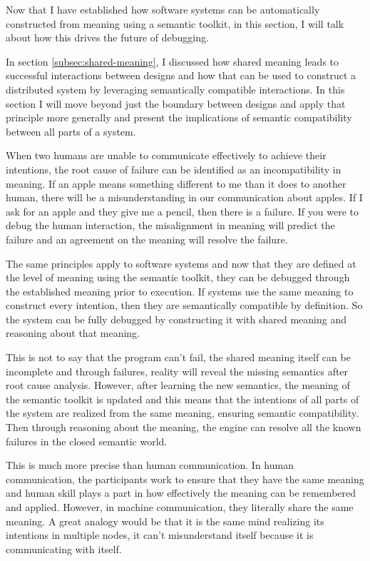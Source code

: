 Now that I have established how software systems can be automatically constructed from meaning using a semantic toolkit, in this section, I will talk about how this drives the future of debugging. 

In section \ref{subsec:shared-meaning}, I discussed how shared meaning leads to successful interactions between designs and how that can be used to construct a distributed system by leveraging semantically compatible interactions. In this section I will move beyond just the boundary between designs and apply that principle more generally and present the implications of semantic compatibility between all parts of a system.

When two humans are unable to communicate effectively to achieve their intentions, the root cause of failure can be identified as an incompatibility in meaning. If an apple means something different to me than it does to another human, there will be a misunderstanding in our communication about apples. If I ask for an apple and they give me a pencil, then there is a failure. If you were to debug the human interaction, the misalignment in meaning will predict the failure and an agreement on the meaning will resolve the failure.

The same principles apply to software systems and now that they are defined at the level of meaning using the semantic toolkit, they can be debugged through the established meaning prior to execution. If systems use the same meaning to construct every intention, then they are semantically compatible by definition. So the system can be fully debugged by constructing it with shared meaning and reasoning about that meaning.

This is not to say that the program can't fail, the shared meaning itself can be incomplete and through failures, reality will reveal the missing semantics after root cause analysis. However, after learning the new semantics, the meaning of the semantic toolkit is updated and this means that the intentions of all parts of the system are realized from the same meaning, ensuring semantic compatibility. Then through reasoning about the meaning, the engine can resolve all the known failures in the closed semantic world.

This is much more precise than human communication. In human communication, the participants work to ensure that they have the same meaning and human skill plays a part in how effectively the meaning can be remembered and applied. However, in machine communication, they literally share the same meaning. A great analogy would be that it is the same mind realizing its intentions in multiple nodes, it can't misunderstand itself because it is communicating with itself. 

